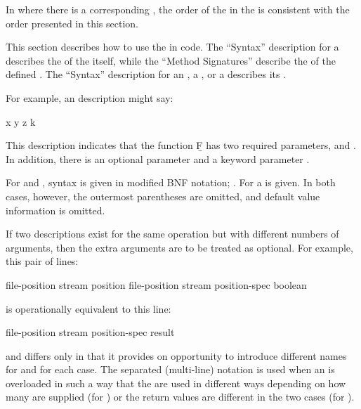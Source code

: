 In  where there is a corresponding ,
the order of the  in the  
is consistent with the order presented in this section.

\endsubsubsection%


This section describes how to use the  in code.
The ``Syntax'' description for a  
describes the  of the  itself, 
while the ``Method Signatures'' describe the  
of the defined .
The ``Syntax'' description for 
     an ,
     a ,
  or a 
describes its .

For example, an  description might say:

 {x y {\opt} z {\key} k}

\noindent This description indicates that the function \b{F} 
has two required parameters,  and .  In addition,
there is an optional parameter  and a keyword parameter .

For  and , syntax is given 
in modified BNF notation; \seesection\ModifiedBNF.
For  a  is given.
In both cases, however, the outermost parentheses are omitted,
and default value information is omitted.


If two descriptions exist for the same operation but with different numbers of
arguments, then the extra arguments are to be treated as optional.  For example,
this pair of lines:

\DefunWithValues file-position {stream} {position}
\DefunWithValues file-position {stream position-spec} {boolean}

\noindent is operationally equivalent to this line:

\DefunWithValues file-position {stream {\opt} position-spec} {result}

\noindent and differs only in that it provides on opportunity to introduce different
names for  and  for each case.
The separated (multi-line) notation is used when an  is overloaded in
such a way that the  are used in different ways
depending on how many  are supplied (\eg for \thefunction{/})
or the return values are different in the two cases (\eg for ).

